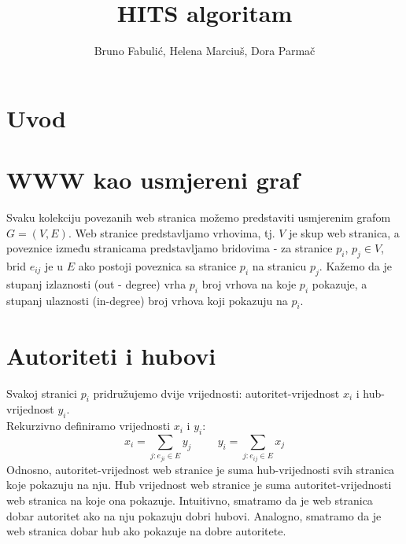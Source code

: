 \documentclass[11pt]{article}
\title{HITS algoritam}
\author{Bruno Fabuli\'{c}, Helena Marciu\v{s}, Dora Parma\v{c}}
\begin{document}
	\maketitle
	\newpage
	\hypersetup{linkcolor=black}
	\tableofcontents
\newpage
\hypersetup{linkcolor=red}

\section{Uvod}


\section{WWW kao usmjereni graf}
Svaku kolekciju povezanih web stranica možemo predstaviti usmjerenim grafom $G=(V,E)$. Web stranice predstavljamo vrhovima, tj. $V$ je skup web stranica, a poveznice između stranicama predstavljamo bridovima - za stranice $p_{i}$, $p_{j} \in V$, brid $e_{ij}$ je u $E$ ako postoji poveznica sa stranice $p_{i}$ na stranicu $p_{j}$. Kažemo da je stupanj izlaznosti (out - degree) vrha $p_{i}$ broj vrhova na koje $p_{i}$ pokazuje, a stupanj ulaznosti (in-degree) broj vrhova koji pokazuju na $p_{i}$.

\section{Autoriteti i hubovi}
Svakoj stranici $p_{i}$ pridružujemo dvije vrijednosti: autoritet-vrijednost $x_{i}$ i hub-vrijednost $y_{i}$. \\
Rekurzivno definiramo vrijednosti $x_{i}$ i $y_{i}$:
\begin{equation} \label{eq:1}
x_{i} = \sum_{j: e_{ji}\in E} y_{j} \hspace{1cm}  y_{i} = \sum_{j: e_{ij}\in E} x_{j}
\end{equation}
Odnosno, autoritet-vrijednost web stranice je suma hub-vrijednosti svih stranica koje pokazuju na nju. Hub vrijednost web stranice je suma autoritet-vrijednosti web stranica na koje ona pokazuje.
Intuitivno, smatramo da je web stranica dobar autoritet ako na nju pokazuju dobri hubovi. Analogno, smatramo da je web stranica dobar hub ako pokazuje na dobre autoritete.
\end{document}
